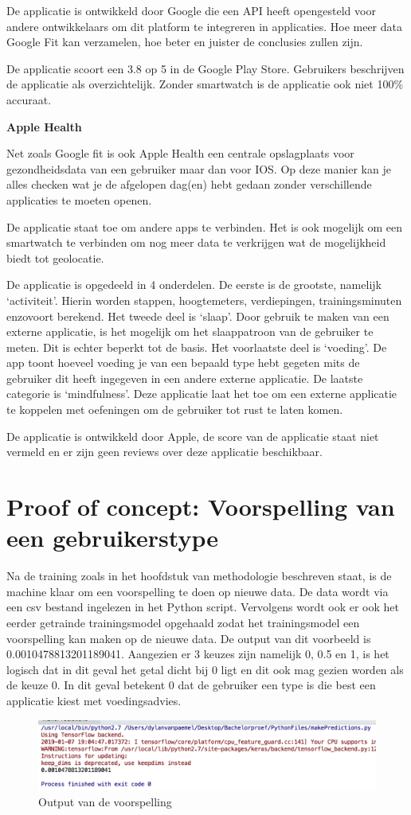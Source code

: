 De applicatie is ontwikkeld door Google die een API heeft opengesteld voor andere ontwikkelaars om dit platform te integreren in applicaties. Hoe meer data Google Fit kan verzamelen, hoe beter en juister de conclusies zullen zijn. 

De applicatie scoort een 3.8 op 5 in de Google Play Store. Gebruikers beschrijven de applicatie als overzichtelijk. Zonder smartwatch is de applicatie ook niet 100\% accuraat. 

\textbf{Apple Health}

Net zoals Google fit is ook Apple Health een centrale opslagplaats voor gezondheidsdata van een gebruiker maar dan voor IOS. Op deze manier kan je alles checken wat je de afgelopen dag(en) hebt gedaan zonder verschillende applicaties te moeten openen.

De applicatie staat toe om andere apps te verbinden. Het is ook mogelijk om een smartwatch te verbinden om nog meer data te verkrijgen wat de mogelijkheid biedt tot geolocatie. 

De applicatie is opgedeeld in 4 onderdelen. De eerste is de grootste, namelijk ‘activiteit’. Hierin worden stappen, hoogtemeters, verdiepingen, trainingsminuten enzovoort berekend. Het tweede deel is ‘slaap’. Door gebruik te maken van een externe applicatie, is het mogelijk om het slaappatroon van de gebruiker te meten. Dit is echter beperkt tot de basis. Het voorlaatste deel is ‘voeding’. De app toont hoeveel voeding je van een bepaald type hebt gegeten mits de gebruiker dit heeft ingegeven in een andere externe applicatie. De laatste categorie is ‘mindfulness’. Deze applicatie laat het toe om een externe applicatie te koppelen met oefeningen om  de gebruiker tot rust te laten komen. 

De applicatie is ontwikkeld door Apple, de score van de applicatie staat niet vermeld en er zijn geen reviews over deze applicatie beschikbaar.

\newpage
\section{Proof of concept: Voorspelling van een gebruikerstype}

Na de training zoals in het hoofdstuk van methodologie beschreven staat, is de machine klaar om een voorspelling te doen op nieuwe data. De data wordt via een csv bestand ingelezen in het Python script. Vervolgens wordt ook er ook het eerder getrainde trainingsmodel opgehaald zodat het trainingsmodel een voorspelling kan maken op de nieuwe data. De output van dit voorbeeld is 0.0010478813201189041. Aangezien er 3 keuzes zijn namelijk 0, 0.5 en 1, is het logisch dat in dit geval het getal dicht bij 0 ligt en dit ook mag gezien worden als de keuze 0. In dit geval betekent 0 dat de gebruiker een type is die best een applicatie kiest met voedingsadvies. 

\begin{figure}[h!]
\centering
\includegraphics[width=1\textwidth]{bachproef/img/output_ml.png}
\caption{Output van de voorspelling}
\end{figure}